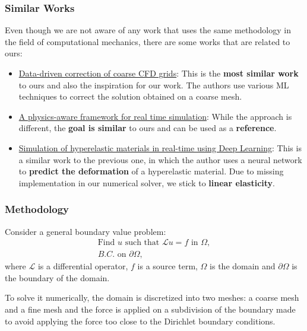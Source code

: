\documentclass{beamer}
\begin{document}
\begin{frame}
\frametitle{Similar Works}
Even though we are not aware of any work that uses the same methodology in the field of computational mechanics, there are some works that are related to ours:
\begin{itemize}
    \item \href{https://www.sciencedirect.com/science/article/abs/pii/S0045793023001962}{Data-driven correction of coarse CFD grids}: This is the \textbf{most similar work} to ours and also the inspiration for our work. The authors use various ML techniques to correct the solution obtained on a coarse mesh.
    \item \href{https://arxiv.org/pdf/2109.09491}{A physics-aware framework for real time simulation}: While the approach is different, the \textbf{goal is similar} to ours and can be used as a \textbf{reference}.
    \item \href{https://arxiv.org/abs/1904.06197}{Simulation of hyperelastic materials in real-time using Deep Learning}: This is a similar work to the previous one, in which the author uses a neural network to \textbf{predict the deformation} of a hyperelastic material. Due to missing implementation in our numerical solver, we stick to \textbf{linear elasticity}.
\end{itemize}
\end{frame}






\begin{frame}
\frametitle{Methodology}
Consider a general boundary value problem:
\[
    \begin{split}
        \text{Find } u \text{ such that } \mathcal{L}u = f \text{ in } \Omega,\\
        B.C. \text{ on } \partial \Omega,
    \end{split}
\]
where \(\mathcal{L}\) is a differential operator, \(f\) is a source term, \(\Omega\) is the domain and \(\partial \Omega\) is the boundary of the domain. 

\vspace{0.5cm}
To solve it numerically, the domain is discretized into two meshes: a coarse mesh and a fine mesh and the force is applied on a subdivision of the boundary made to avoid applying the force too close to the Dirichlet boundary conditions. 
\end{frame}
\end{document}
